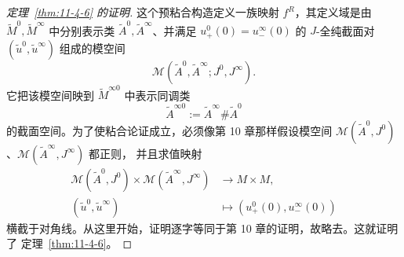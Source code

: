 \begin{proof}[定理~\ref{thm:11-4-6} 的证明]
这个预粘合构造定义一族映射 $f^R$，其定义域是由
$\widetilde M^0,\widetilde M^\infty$ 中分别表示类
$\widetilde A^0,\widetilde A^\infty$、并满足
$u_+^0(0)=u_-^\infty(0)$ 的 $J$-全纯截面对
$(\widetilde u^0,\widetilde u^\infty)$ 组成的模空间
\[
  \mathcal M(\widetilde A^0,\widetilde A^\infty;J^0,J^\infty).
\]
它把该模空间映到 $\widetilde M^{\infty0}$ 中表示同调类
\[
  \widetilde A^{\infty0}:=\widetilde A^\infty\#\widetilde A^0
\]
的截面空间。为了使粘合论证成立，必须像第 10 章那样假设模空间
$\mathcal M(\widetilde A^0,J^0)$、$\mathcal M(\widetilde A^\infty,J^\infty)$ 都正则，
并且求值映射
\[
\begin{aligned}
  \mathcal M(\widetilde A^0,J^0)\times
  \mathcal M(\widetilde A^\infty,J^\infty)
  &\longrightarrow M\times M,\\
  (\widetilde u^0,\widetilde u^\infty)
  &\longmapsto(u_+^0(0),u_-^\infty(0))
\end{aligned}
\]
横截于对角线。从这里开始，证明逐字等同于第 10 章的证明，故略去。这就证明了
定理~\ref{thm:11-4-6}。
\end{proof}

